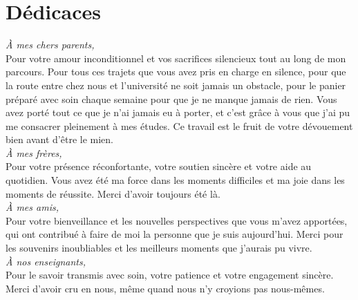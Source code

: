 \chapter*{Dédicaces}

\vspace{2cm}

\begin{center}

\textit{À mes chers parents,}\\[0.3cm]
Pour votre amour inconditionnel et vos sacrifices silencieux tout au long de mon parcours. Pour tous ces trajets que vous avez pris en charge en silence, pour que la route entre chez nous et l'université ne soit jamais un obstacle, pour le panier préparé avec soin chaque semaine pour que je ne manque jamais de rien. Vous avez porté tout ce que je n'ai jamais eu à porter, et c'est grâce à vous que j'ai pu me consacrer pleinement à mes études. Ce travail est le fruit de votre dévouement bien avant d'être le mien.\\[1cm]

\textit{À mes frères,}\\[0.3cm]
Pour votre présence réconfortante, votre soutien sincère et votre aide au quotidien. Vous avez été ma force dans les moments difficiles et ma joie dans les moments de réussite. Merci d'avoir toujours été là.\\[1cm]

\textit{À mes amis,}\\[0.3cm]
Pour votre bienveillance et les nouvelles perspectives que vous m'avez apportées, qui ont contribué à faire de moi la personne que je suis aujourd'hui. Merci pour les souvenirs inoubliables et les meilleurs moments que j'aurais pu vivre.\\[1cm]

\textit{À nos enseignants,}\\[0.3cm]
Pour le savoir transmis avec soin, votre patience et votre engagement sincère. Merci d'avoir cru en nous, même quand nous n'y croyions pas nous-mêmes.

\end{center}
